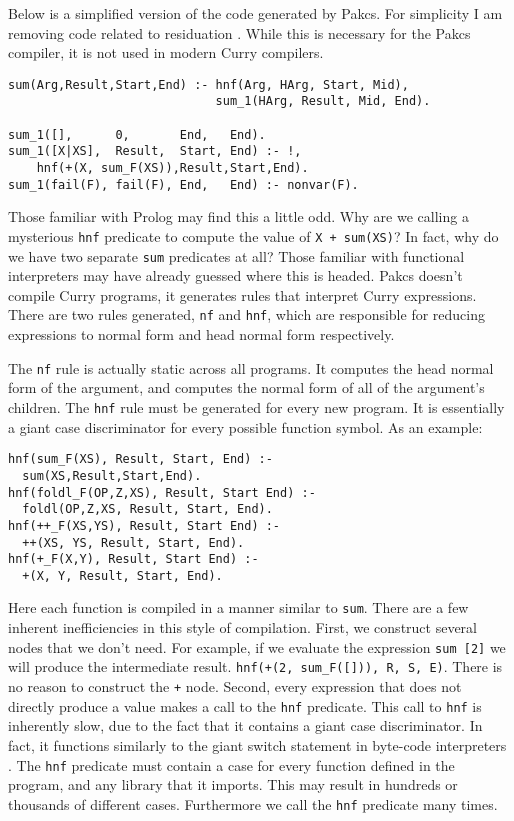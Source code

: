 Below is a simplified version of the code generated by Pakcs.
For simplicity I am removing code related to residuation \cite{Hanus17PAKCS}.
While this is necessary for the Pakcs compiler, it is not used in modern Curry compilers.

\begin{verbatim}
sum(Arg,Result,Start,End) :- hnf(Arg, HArg, Start, Mid),
                             sum_1(HArg, Result, Mid, End).

sum_1([],      0,       End,   End).
sum_1([X|XS],  Result,  Start, End) :- !, 
    hnf(+(X, sum_F(XS)),Result,Start,End).
sum_1(fail(F), fail(F), End,   End) :- nonvar(F).
\end{verbatim}

Those familiar with Prolog may find this a little odd.
Why are we calling a mysterious \texttt{hnf} predicate to compute the value of \texttt{X + sum(XS)}?
In fact, why do we have two separate \texttt{sum} predicates at all?
Those familiar with functional interpreters may have already guessed where this is headed.
Pakcs doesn't compile Curry programs, it generates rules that interpret Curry expressions.
There are two rules generated, \texttt{nf} and \texttt{hnf}, which are responsible for reducing expressions
to normal form and head normal form respectively.

The \texttt{nf} rule is actually static across all programs.  It computes the head normal form of the argument,
and computes the normal form of all of the argument's children.
The \texttt{hnf} rule must be generated for every new program.
It is essentially a giant case discriminator for every possible function symbol.
As an example:

\begin{verbatim}
hnf(sum_F(XS), Result, Start, End) :- 
  sum(XS,Result,Start,End).
hnf(foldl_F(OP,Z,XS), Result, Start End) :- 
  foldl(OP,Z,XS, Result, Start, End).
hnf(++_F(XS,YS), Result, Start End) :- 
  ++(XS, YS, Result, Start, End).
hnf(+_F(X,Y), Result, Start End) :- 
  +(X, Y, Result, Start, End).
\end{verbatim}

Here each function is compiled in a manner similar to \texttt{sum}.
There are a few inherent inefficiencies in this style of compilation.
First, we construct several nodes that we don't need.
For example, if we evaluate the expression \texttt{sum [2]} we will produce the intermediate result.
\texttt{hnf(+(2, sum\_F([])), R, S, E)}.
There is no reason to construct the \texttt + node.
Second, every expression that does not directly produce a value makes a call to the \texttt{hnf}
predicate.
This call to \texttt{hnf} is inherently slow, due to the fact that it contains a giant case discriminator.
In fact, it functions similarly to the giant switch statement in byte-code interpreters \cite{vmSwitch}.
The \texttt{hnf} predicate must contain a case for every function defined in the program, and any library that it imports.
This may result in hundreds or thousands of different cases.  Furthermore we call the \texttt{hnf} predicate many times.

